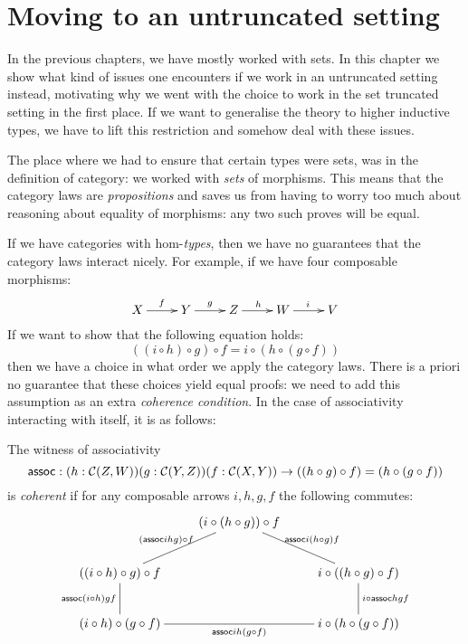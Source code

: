 \chapter{Moving to an untruncated setting}
\label{untruncated}

In the previous chapters, we have mostly worked with sets. In this
chapter we show what kind of issues one encounters if we work in an
untruncated setting instead, motivating why we went with the choice to
work in the set truncated setting in the first place. If we want to
generalise the theory to higher inductive types, we have to lift this
restriction and somehow deal with these issues.

The place where we had to ensure that certain types were sets, was in
the definition of category: we worked with \emph{sets} of
morphisms. This means that the category laws are \emph{propositions}
and saves us from having to worry too much about reasoning about
equality of morphisms: any two such proves will be equal.

If we have categories with hom-\emph{types}, then we have no
guarantees that the category laws interact nicely. For example, if we
have four composable morphisms:
$$
\xymatrix{
  X \ar[r]^{f} &Y \ar[r]^{g} &Z \ar[r]^{h} &W \ar[r]^{i} &V
}
$$
If we want to show that the following equation holds:
$$
((i \circ h) \circ g) \circ f = i \circ (h \circ (g \circ f))
$$
then we have a choice in what order we apply the category laws. There
is a priori no guarantee that these choices yield equal proofs: we
need to add this assumption as an extra \emph{coherence condition}. In
the case of associativity interacting with itself, it is as follows:

\begin{definition}
  The witness of associativity
  $$
  \assoc : (h : \Cc(Z,W)) (g : \Cc(Y,Z)) (f : \Cc(X,Y)) \to ((h \circ g) \circ f) = (h \circ (g \circ f))
  $$
  is \emph{coherent} if for any composable arrows $i, h, g, f$ the
  following commutes:
  $$
  \xymatrix{
    &(i \circ (h \circ g)) \circ f \ar@{-}[dr]^{\assoc i (h \circ g) f} &\\
    ((i \circ h) \circ g) \circ f \ar@{-}[ur]^{(\assoc i h g) \circ f} \ar@{-}[d]_{\assoc (i \circ h) g f}  &&i \circ ((h \circ g) \circ f) \ar@{-}[d]^{i \circ \assoc h g f}\\
    (i \circ h) \circ (g \circ f) \ar@{-}[rr]_{\assoc i h (g \circ f)} &&i \circ (h \circ (g \circ f))
  }
  $$
\end{definition}

